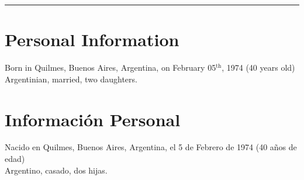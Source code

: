 
\hrule
\ifeng
\section*{Personal Information}
Born in Quilmes, Buenos Aires, Argentina, on February 05$^\mathrm{th}$, 1974 (40 years old)\\
Argentinian, married, two daughters.
\else
\section*{Información Personal}
Nacido en Quilmes, Buenos Aires, Argentina, el 5 de Febrero de 1974 (40 años de edad)\\
Argentino, casado, dos hijas.
\fi
